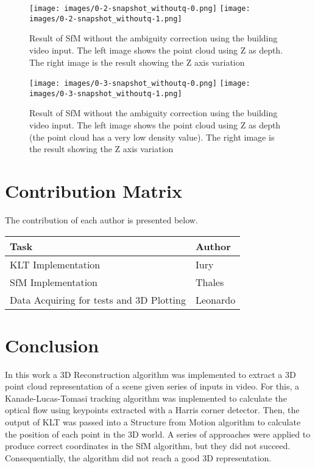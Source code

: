 \documentclass[]{IEEEtran}
\begin{document}
\begin{figure}[H]
    \centering
    \texttt{[image: images/0-2-snapshot\_withoutq-0.png]}
    \texttt{[image: images/0-2-snapshot\_withoutq-1.png]}
    \caption{Result of SfM without the ambiguity correction using the building video input. The left image shows the point cloud using Z as depth. The right image is the result showing the Z axis variation}
    \label{fig:i-2wq}
\end{figure}

\begin{figure}[H]
    \centering
    \texttt{[image: images/0-3-snapshot\_withoutq-0.png]}
    \texttt{[image: images/0-3-snapshot\_withoutq-1.png]}
    \caption{Result of SfM without the ambiguity correction using the building video input. The left image shows the point cloud using Z as depth (the point cloud has a very low density value). The right image is the result showing the Z axis variation}
    \label{fig:i-3wq}
\end{figure}


\section{Contribution Matrix}

The contribution of each author is presented below.

\begin{table}[H]
\begin{tabular}{|l|l|}
\hline
\textbf{Task}                       & \textbf{Author} \\ \hline
KLT Implementation                 & Iury      \\ \hline
SfM Implementation                 & Thales          \\ \hline
Data Acquiring for tests and 3D Plotting    & Leonardo          \\ \hline

\end{tabular}
\end{table}


\section{Conclusion}

In this work a 3D Reconstruction algorithm was implemented to extract a 3D point cloud representation of a scene given series of inputs in video. For this, a Kanade-Lucas-Tomasi tracking algorithm was implemented to calculate the optical flow using keypoints extracted with a Harris corner detector. Then, the output of KLT was passed into a Structure from Motion algorithm to calculate the position of each point in the 3D world. A series of approaches were applied to produce correct coordinates in the SfM algorithm, but they did not succeed. Consequentially, the algorithm did not reach a good 3D representation.

\printbibliography
\end{document}
